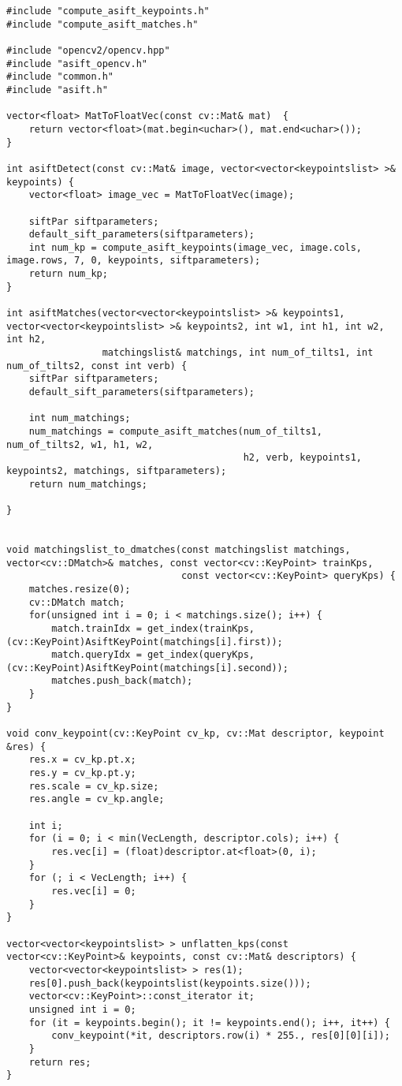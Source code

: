 \begin{lstlisting}
#include "compute_asift_keypoints.h"
#include "compute_asift_matches.h"

#include "opencv2/opencv.hpp"
#include "asift_opencv.h"
#include "common.h"
#include "asift.h"

vector<float> MatToFloatVec(const cv::Mat& mat)  {
	return vector<float>(mat.begin<uchar>(), mat.end<uchar>());
}

int asiftDetect(const cv::Mat& image, vector<vector<keypointslist> >& keypoints) {
	vector<float> image_vec = MatToFloatVec(image);
	
	siftPar siftparameters;
	default_sift_parameters(siftparameters);
	int num_kp = compute_asift_keypoints(image_vec, image.cols, image.rows, 7, 0, keypoints, siftparameters);
	return num_kp;
}

int asiftMatches(vector<vector<keypointslist> >& keypoints1, vector<vector<keypointslist> >& keypoints2, int w1, int h1, int w2, int h2,
                 matchingslist& matchings, int num_of_tilts1, int num_of_tilts2, const int verb) {
	siftPar siftparameters;
	default_sift_parameters(siftparameters);
	
	int num_matchings;
	num_matchings = compute_asift_matches(num_of_tilts1, num_of_tilts2, w1, h1, w2, 
                                          h2, verb, keypoints1, keypoints2, matchings, siftparameters);
	return num_matchings;
	
}


void matchingslist_to_dmatches(const matchingslist matchings, vector<cv::DMatch>& matches, const vector<cv::KeyPoint> trainKps,
                               const vector<cv::KeyPoint> queryKps) {
    matches.resize(0);
    cv::DMatch match;
    for(unsigned int i = 0; i < matchings.size(); i++) {
        match.trainIdx = get_index(trainKps, (cv::KeyPoint)AsiftKeyPoint(matchings[i].first));
        match.queryIdx = get_index(queryKps, (cv::KeyPoint)AsiftKeyPoint(matchings[i].second));
        matches.push_back(match);
    }
}

void conv_keypoint(cv::KeyPoint cv_kp, cv::Mat descriptor, keypoint &res) {
    res.x = cv_kp.pt.x;
    res.y = cv_kp.pt.y;
    res.scale = cv_kp.size;
    res.angle = cv_kp.angle;
    
    int i;
    for (i = 0; i < min(VecLength, descriptor.cols); i++) {
        res.vec[i] = (float)descriptor.at<float>(0, i);
    }
    for (; i < VecLength; i++) {
        res.vec[i] = 0;
    }
}

vector<vector<keypointslist> > unflatten_kps(const vector<cv::KeyPoint>& keypoints, const cv::Mat& descriptors) {
    vector<vector<keypointslist> > res(1);
    res[0].push_back(keypointslist(keypoints.size()));
    vector<cv::KeyPoint>::const_iterator it;
    unsigned int i = 0;
    for (it = keypoints.begin(); it != keypoints.end(); i++, it++) {
        conv_keypoint(*it, descriptors.row(i) * 255., res[0][0][i]);
    }
    return res;
}


\end{lstlisting}
